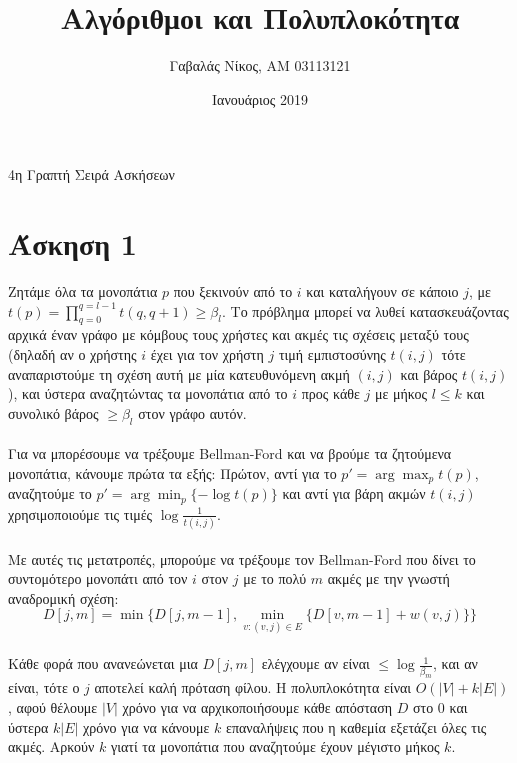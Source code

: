\documentclass[12pt,a4paper]{article}
\title{Αλγόριθμοι και Πολυπλοκότητα}
\author{Γαβαλάς Νίκος, AM 03113121}
\date{Ιανουάριος 2019}
\begin{document}
  \maketitle

  \begin{center}
    \Large{4η Γραπτή Σειρά Ασκήσεων}
  \end{center}

  \section{Άσκηση 1}

    Ζητάμε όλα τα μονοπάτια \(p\) που ξεκινούν από το \(i\) και καταλήγουν σε
    κάποιο \(j\), με \(t(p) = \prod_{q=0}^{q=l-1}{t(q, q+1)} \ge β_l\).
    Το πρόβλημα μπορεί να λυθεί
    κατασκευάζοντας αρχικά έναν γράφο με κόμβους τους χρήστες και ακμές τις
    σχέσεις μεταξύ τους (δηλαδή αν ο χρήστης \(i\) έχει για τον χρήστη \(j\)
    τιμή εμπιστοσύνης \(t(i, j)\) τότε αναπαριστούμε τη σχέση αυτή με μία 
    κατευθυνόμενη ακμή \((i, j)\) και βάρος \(t(i, j)\)), και ύστερα αναζητώντας
    τα μονοπάτια από το \(i\) προς κάθε \(j\) με μήκος \(l \le k\)
    και συνολικό βάρος \( \ge β_l \) στον γράφο αυτόν.
    \\
    \\
    Για να μπορέσουμε να τρέξουμε {\latintext Bellman-Ford} και να βρούμε τα
    ζητούμενα μονοπάτια, κάνουμε πρώτα τα εξής: Πρώτον, αντί για το 
    \(p' = \arg\max_{p}{t(p)}\), αναζητούμε το \(p' = \arg\min_{p}{\{-\log
    {t(p)}}\}\) και αντί για βάρη ακμών \(t(i, j)\) χρησιμοποιούμε τις τιμές
    \( \log{\frac{1}{t(i, j)}} \).
    \\
    \\
    Με αυτές τις μετατροπές, μπορούμε να τρέξουμε τον {\latintext Bellman-Ford}
    που δίνει το συντομότερο μονοπάτι από τον \(i\) στον \(j\) με το πολύ \(m\)
    ακμές με την γνωστή αναδρομική σχέση:
    \[ D[j, m] = \min\{{D[j, m - 1],
      \min_{v : (v, j)\in E}\{ D[v, m - 1] + w(v, j) }\}\} \]
    \\
    Κάθε φορά που ανανεώνεται μια \(D[j, m]\) ελέγχουμε αν είναι \(\le 
    \log{\frac{1}{β_{m}}}\), και αν είναι, τότε ο \(j\) αποτελεί καλή πρόταση
    φίλου. Η πολυπλοκότητα είναι \(Ο(|V| + k|E|)\), αφού θέλουμε \(|V|\) χρόνο
    για να αρχικοποιήσουμε κάθε απόσταση \(D\) στο \(0\) και ύστερα \(k|Ε|\)
    χρόνο για να κάνουμε \(k\) επαναλήψεις που η καθεμία εξετάζει όλες τις
    ακμές. Αρκούν \(k\) γιατί τα μονοπάτια που αναζητούμε έχουν μέγιστο μήκος
    \(k\).
\end{document}
